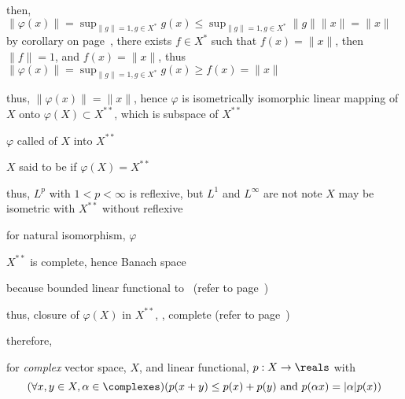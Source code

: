 \documentclass[17pt,landscape]{foils}
\begin{document}
{{	\bit
		\vitem then,
		$
			\|\varphi(x)\|
			= \sup_{\|g\|=1, g\in X^\ast} g(x)
			\leq \sup_{\|g\|=1, g\in X^\ast} \|g\|\|x\|
			= \|x\|
		$
		\vitem by corollary on page~\pageref{page:Hahn-Banach-theorem}, there exists
			$f\in X^\ast$ such that $f(x)=\|x\|$,
			then $\|f\|=1$, and $f(x)=\|x\|$, thus $\|\varphi(x)\| = \sup_{\|g\|=1, g\in X^\ast} g(x) \geq f(x) = \|x\|$

		\vitem thus, $\|\varphi(x)\| = \|x\|$,
			hence $\varphi$ is isometrically isomorphic linear mapping of $X$ onto $\varphi(X)\subset X^{\ast\ast}$,
			which is subspace of $X^{\ast\ast}$

		\vitem $\varphi$ called  of $X$ into $X^{\ast\ast}$

		\vitem $X$ said to be  if $\varphi(X)=X^{\ast\ast}$
	\eit

	\vitem thus, $L^p$ with $1< p<\infty$ is reflexive, but $L^1$ and $L^\infty$ are not
	\vvitem note $X$ may be isometric with $X^{\ast\ast}$ without reflexive
\eit


%

\bit
	\item for natural isomorphism, $\varphi$

	\vitem $X^{\ast\ast}$ is complete, hence Banach space
	\bit
		\item because bounded linear functional to \reals\ (refer to page~\pageref{page:Properties-of-linear-operators})
	\eit

	\vitem thus, closure of $\varphi(X)$ in $X^{\ast\ast}$, , complete
		(refer to page~\pageref{page:subspaces})

	\vitem therefore, 
\eit



\bit
	\item {}
		for \emph{complex} vector space, $X$, and linear functional, $p:X \to \reals$ with
\[
		(
			\forall x,y\in X, \alpha \in\complexes
		)
		(
			p(x+y)\leq p(x) + p(y) \mbox{ and } p(\alpha x) = |\alpha| p(x)
		)
\]

}}
\end{document}
